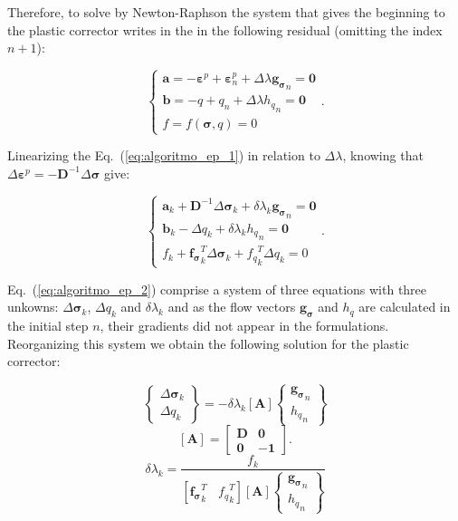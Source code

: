 \documentclass[Journal,letterpaper]{ascelike-new}
\newcommand{\All}{\boldsymbol A}
\newcommand{\al}{\boldsymbol a}
\newcommand{\bl}{\boldsymbol b}
\newcommand{\Dsdee}{\boldsymbol{D}}
\newcommand{\dfds}{\boldsymbol{f_\sigma}}
\newcommand{\hl}{{h_q}}
\newcommand{\dfdq}{{f_q}}
\newcommand{\strainp}{\boldsymbol{\varepsilon}^{p}}
\newcommand{\zerol}{\boldsymbol 0}
\newcommand{\onell}{\boldsymbol{1}}
\newcommand{\dgds}{\boldsymbol{g_\sigma}}
\newcommand{\stress}{\boldsymbol{\sigma}}
\begin{document}
Therefore, to solve by Newton-Raphson the system that gives the beginning to the plastic corrector writes in the in the following residual (omitting the index $n+1$):

\begin{equation}
	\label{eq:algoritmo_ep_1}
	\left\{
	\begin{array}{lcl}
		\al = -\strainp + \strainp_n + \Delta \lambda \dgds_n = \zerol	\\
		\bl = -q + q_n + \Delta\lambda\hl_n = \zerol \\
		f = f(\stress,q) = 0
	\end{array}
	\right..
\end{equation}

Linearizing the Eq.~(\ref{eq:algoritmo_ep_1}) in relation to $\Delta \lambda$, knowing that $\Delta \strainp = - \Dsdee^{-1}\Delta\stress$ give:

\begin{equation}
	\label{eq:algoritmo_ep_2}
	\left\{
	\begin{array}{lcl}
		\al_k + \Dsdee^{-1}\Delta\stress_k + \delta \lambda_k \dgds_n = \zerol \\
		\bl_k - \Delta q_k + \delta \lambda_k \hl_n = \zerol \\
		f_k + \dfds_k^T\Delta\stress_k + \dfdq_k^T \Delta q_k = 0
	\end{array}
	\right..
\end{equation}

Eq.~(\ref{eq:algoritmo_ep_2}) comprise a system of three equations with three unkowns: $\Delta \stress_k$, $\Delta q_k$ and $\delta \lambda_k$ and as the flow vectors $\dgds$ and $\hl$ are calculated in the initial step $n$, their gradients did not appear in the formulations. Reorganizing this system we obtain the following solution for the plastic corrector:

\begin{equation}
	\label{eq:algoritmo_ep_3}
	\left\{
	\begin{array}{lcl}
		\Delta \stress_k \\
		\Delta q_k
	\end{array}
	\right\} = -\delta\lambda_k \left[ \All \right]
	\left\{	
	\begin{array}{lcl}
		\dgds_n \\
		\hl_n
	\end{array}
	\right\}
\end{equation}
\begin{equation}
	\label{eq:Ak}
	\left[ \All \right] =
	\begin{bmatrix}
		\Dsdee & \zerol \\
		\zerol & -\onell
	\end{bmatrix}.
\end{equation}
\begin{equation}
	\label{eq:deltalambdak}
	\delta \lambda_k = \dfrac{f_k}{\left[\dfds_k^T~~~~\dfdq_k^T\right]\left[\All \right]\left\{ 
		\begin{array}{lcl}
			\dgds_n \\ 
			\hl_n
		\end{array}\right\}}
\end{equation}
\end{document}
